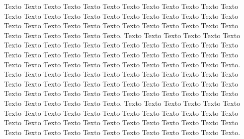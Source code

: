 \paragrafo{}
Texto Texto Texto Texto Texto Texto Texto Texto Texto Texto Texto Texto Texto Texto Texto Texto Texto Texto Texto Texto Texto Texto Texto Texto Texto Texto Texto Texto Texto Texto Texto Texto Texto Texto Texto Texto Texto Texto Texto Texto Texto Texto.
\paragrafo{}
Texto Texto Texto Texto Texto Texto Texto Texto Texto Texto Texto Texto Texto Texto Texto Texto Texto Texto Texto Texto Texto Texto Texto Texto Texto Texto Texto Texto Texto Texto Texto Texto Texto Texto Texto Texto Texto Texto Texto Texto Texto Texto.
\paragrafo{}
Texto Texto Texto Texto Texto Texto Texto Texto Texto Texto Texto Texto Texto Texto Texto Texto Texto Texto Texto Texto Texto Texto Texto Texto Texto Texto Texto Texto Texto Texto Texto Texto Texto Texto Texto Texto Texto Texto Texto Texto Texto Texto.
\paragrafo{}
Texto Texto Texto Texto Texto Texto Texto Texto Texto Texto Texto Texto Texto Texto Texto Texto Texto Texto Texto Texto Texto Texto Texto Texto Texto Texto Texto Texto Texto Texto Texto Texto Texto Texto Texto Texto Texto Texto Texto Texto Texto Texto.